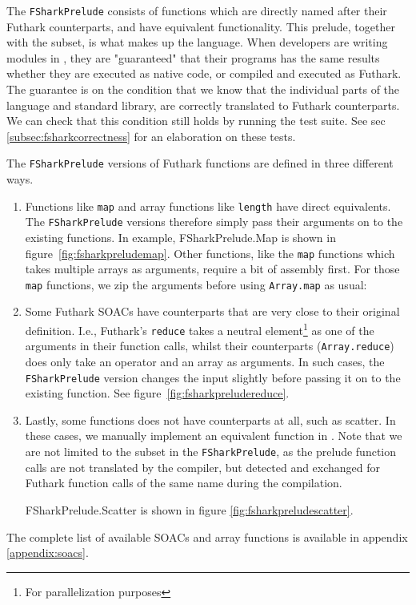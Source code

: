 The \texttt{FSharkPrelude} consists of functions which are directly named after
their Futhark counterparts, and have equivalent functionality.
This prelude, together with the \fshark{} subset, is what makes up the \fshark{} language.
When \fshark{} developers are writing modules in \fshark{}, they are "guaranteed"
that their \fshark{} programs has the same results whether they are executed as
native \fsharp{} code, or compiled and executed as Futhark. 
The guarantee is on the condition that we know that the
individual parts of the \fshark{} language and standard library,  are correctly
translated to Futhark counterparts.
We can check that this condition still holds by running the \fshark{} test
suite. See sec \ref{subsec:fsharkcorrectness} for an elaboration on these tests.


The \texttt{FSharkPrelude} versions of Futhark functions are defined in three
different ways.
\begin{enumerate}
  \item Functions like \texttt{map} and array functions like
    \texttt{length} have direct \fsharp{} equivalents. The
    \texttt{FSharkPrelude} versions therefore simply pass their arguments on to
    the existing functions. In example, FSharkPrelude.Map is shown in 
    figure~\ref{fig:fsharkpreludemap}.
    Other functions, like the \texttt{map} functions which takes multiple arrays as
    arguments, require a bit of assembly first. For those \texttt{map} functions,
    we zip the arguments before using \texttt{Array.map} as usual:

  \item Some Futhark SOACs have \fsharp{} counterparts that are very close to
    their original definition.
    I.e., Futhark's \texttt{reduce} takes a neutral element\footnote{For
      parallelization purposes} as one of the
    arguments in their function calls, whilst their \fsharp{} counterparts
    (\texttt{Array.reduce}) does only take an operator and an array as
    arguments.
    In such cases, the \texttt{FSharkPrelude} version changes the input slightly
    before passing it on to the existing function. See figure~\ref{fig:fsharkpreludereduce}.

  \item Lastly, some functions does not have \fsharp{} counterparts at all, such
    as scatter. In these cases, we manually implement an equivalent function in
    \fsharp{}.
    Note that we are not limited to the \fshark{} subset in the
    \texttt{FSharkPrelude}, as the prelude function calls are not translated by the
    \fshark{} compiler, but detected and exchanged for
    Futhark function calls of the same name during the \fshark{} compilation.

    FSharkPrelude.Scatter is shown in figure \ref{fig:fsharkpreludescatter}.

\end{enumerate}
The complete list of available SOACs and array functions is available in
appendix \ref{appendix:soacs}.

